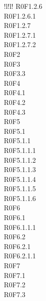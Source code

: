 \begin{tabella}{!{\VRule}l!{\VRule}l!{\VRule}}
{				R0F1.2.6 \\
				R0F1.2.6.1 \\
				R0F1.2.7 \\
				R0F1.2.7.1 \\
				R0F1.2.7.2 \\
				R0F2 \\
				R0F3 \\
				R0F3.3 \\
				R0F4 \\
				R0F4.1 \\
				R0F4.2 \\
				R0F4.3 \\
				R0F5 \\
				R0F5.1 \\
				R0F5.1.1 \\
				R0F5.1.1.1 \\
				R0F5.1.1.2 \\
				R0F5.1.1.3 \\
				R0F5.1.1.4 \\
				R0F5.1.1.5 \\
				R0F5.1.1.6 \\
				R0F6 \\
				R0F6.1 \\
				R0F6.1.1.1 \\
				R0F6.2 \\
				R0F6.2.1 \\
				R0F6.2.1.1 \\
				R0F7 \\
				R0F7.1 \\
				R0F7.2 \\
				R0F7.3 \\
			}\\ 
			

\end{tabella}

